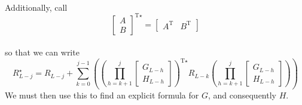 \documentclass{article}
\begin{document}
\paragraph{}
Additionally, call
\[ \boxed{
\begin{bmatrix}
A \\
B
\end{bmatrix}^{\text{T}\star}
=
\begin{bmatrix}
A^{\text{T}} & B^{\text{T}}
\end{bmatrix}
} \]

\paragraph{}
so that we can write
\[ \boxed{
R^{\star}_{L-j} = R_{L-j} + \sum_{k=0}^{j-1} \left( \left( \prod_{h = k+1}^{j}
\begin{bmatrix}
G_{L-h} \\
H_{L-h}
\end{bmatrix}
\right)^{\text{T}\star}
R_{L-k}
\left( \prod_{h = k+1}^{j}
\begin{bmatrix}
G_{L-h} \\
H_{L-h}
\end{bmatrix}
\right)
\right)
} \]
We must then use this to find an explicit formula for $G$, and consequently $H$.
\end{document}
